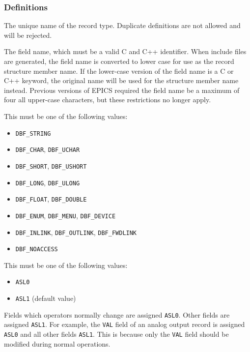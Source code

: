\subsubsection{Definitions}

\begin{description}
\item [record\_type] The unique name of the record type.
Duplicate definitions are not allowed and will be rejected.

\item [field\_name] The field name, which must be a valid C and C++ identifier.
When include files are generated, the field name is converted to lower case for use as the record structure member name.
If the lower-case version of the field name is a C or C++ keyword, the original name will be used for the structure member name instead.
Previous versions of EPICS required the field name be a maximum of four all upper-case characters, but these restrictions no longer apply.

\item [field\_type] This must be one of the following values:

\begin{itemize}
\item \verb|DBF_STRING|
\item \verb|DBF_CHAR|, \verb|DBF_UCHAR|
\item \verb|DBF_SHORT|, \verb|DBF_USHORT|
\item \verb|DBF_LONG|, \verb|DBF_ULONG|
\item \verb|DBF_FLOAT|, \verb|DBF_DOUBLE|
\item \verb|DBF_ENUM|, \verb|DBF_MENU|, \verb|DBF_DEVICE|
\item \verb|DBF_INLINK|, \verb|DBF_OUTLINK|, \verb|DBF_FWDLINK|
\item \verb|DBF_NOACCESS|
\end{itemize}

\item [as\_level] This must be one of the following values:

\begin{itemize}
\item \verb|ASL0|
\item \verb|ASL1|  (default value)
\end{itemize}

Fields which operators normally change are assigned \verb|ASL0|.
Other fields are assigned \verb|ASL1|.
For example, the \verb|VAL| field of an analog output record is assigned \verb|ASL0| and all other fields \verb|ASL1|.
This is because only the \verb|VAL| field should be modified during normal operations.


\end{description}
